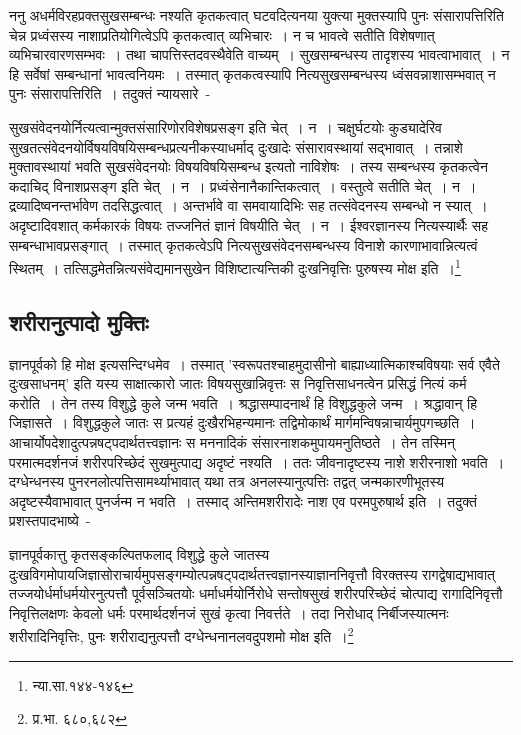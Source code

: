 		ननु अधर्मविरहप्रक्तसुखसम्बन्धः नश्यति कृतकत्वात् घटवदित्यनया युक्त्या मुक्तस्यापि पुनः संसारापत्तिरिति चेन्न प्रध्वंसस्य नाशाप्रतियोगित्वेऽपि कृतकत्वात् व्यभिचारः~। न च भावत्वे सतीति विशेषणात् व्यभिचारवारणसम्भवः~। तथा चापत्तिस्तदवस्थैवेति वाच्यम्~। सुखसम्बन्धस्य तादृशस्य भावत्वाभावात्~। न हि सर्वेषां सम्बन्धानां भावत्वनियमः~। तस्मात् कृतकत्वस्यापि नित्यसुखसम्बन्धस्य ध्वंसवन्नाशासम्भवात् न पुनः संसारापत्तिरिति~। तदुक्तं न्यायसारे~-

		{\fontsize{11.7}{0}\selectfont\s सुखसंवेदनयोर्नित्यत्वान्मुक्तसंसारिणोरविशेषप्रसङ्ग इति चेत्~। न~। चक्षुर्घटयोः कुड्यादेरिव सुखतत्संवेदनयोर्विषयविषयिसम्बन्धप्रत्यनीकस्याधर्माद् दुःखादेः संसारावस्थायां सद्भावात्~। तन्नाशे मुक्तावस्थायां भवति सुखसंवेदनयोः विषयविषयिसम्बन्ध इत्यतो नाविशेषः~। तस्य सम्बन्धस्य कृतकत्वेन कदाचिद् विनाशप्रसङ्ग इति चेत्~। न~। प्रध्वंसेनानैकान्तिकत्वात्~। वस्तुत्वे सतीति चेत्~। न~। द्रव्यादिष्वनन्तर्भावेण तदसिद्धत्वात्~। अन्तर्भावे वा समवायादिभिः सह तत्संवेदनस्य सम्बन्धो न स्यात्~। अदृष्टादिवशात् कर्मकारकं विषयः तज्जनितं ज्ञानं विषयीति चेत्~। न~। ईश्वरज्ञानस्य नित्यस्यार्थैः सह सम्बन्धाभावप्रसङ्गात्~। तस्मात् कृतकत्वेऽपि नित्यसुखसंवेदनसम्बन्धस्य विनाशे कारणाभावान्नित्यत्वं स्थितम्~। तत्सिद्धमेतन्नित्यसंवेद्यमानसुखेन विशिष्टात्यन्तिकी दुःखनिवृत्तिः पुरुषस्य मोक्ष इति~।\footnote{न्या.सा.१४४-१४६}}

		\subsection{शरीरानुत्पादो मुक्तिः}

		ज्ञानपूर्वको हि मोक्ष इत्यसन्दिग्धमेव~। तस्मात् 'स्वरूपतश्चाहमुदासीनो बाह्याध्यात्मिकाश्चविषयाः सर्व एवैते दुःखसाधनम्' इति यस्य साक्षात्कारो जातः विषयसुखान्निवृत्तः स निवृत्तिसाधनत्वेन प्रसिद्धं नित्यं कर्म करोति~। तेन तस्य विशुद्धे कुले जन्म भवति~। श्रद्धासम्पादनार्थं हि विशुद्धकुले जन्म~। श्रद्धावान् हि जिज्ञासते~। विशुद्धकुले जातः स प्रत्यहं दुःखैरभिहन्यमानः तद्विमोकार्थं मार्गमन्विषन्नाचार्यमुपगच्छति~। आचार्योपदेशादुत्पन्नषट्पदार्थतत्त्वज्ञानः स मननादिकं संसारनाशकमुपायमनुतिष्ठते~। तेन तस्मिन् परमात्मदर्शनजं शरीरपरिच्छेदं सुखमुत्पाद्य अदृष्टं नश्यति~। ततः जीवनादृष्टस्य नाशे शरीरनाशो भवति~। दग्धेन्धनस्य पुनरनलोत्पत्तिसामर्थ्याभावात् यथा तत्र अनलस्यानुत्पत्तिः तद्वत् जन्मकारणीभूतस्य अदृष्टस्यैवाभावात् पुनर्जन्म न भवति~। तस्माद् अन्तिमशरीरादेः नाश एव परमपुरुषार्थ इति~। तदुक्तं प्रशस्तपादभाष्ये~-

		{\fontsize{11.7}{0}\selectfont\s ज्ञानपूर्वकात्तु कृतसङ्कल्पितफलाद् विशुद्धे कुले जातस्य दुःखविगमोपायजिज्ञासोराचार्यमुपसङ्गम्योत्पन्नषट्पदार्थतत्त्वज्ञानस्याज्ञाननिवृत्तौ विरक्तस्य रागद्वेषाद्यभावात् तज्जयोर्धर्माधर्मयोरनुत्पत्तौ पूर्वसञ्चितयोः धर्माधर्मयोर्निरोधे सन्तोषसुखं शरीरपरिच्छेदं चोत्पाद्य रागादिनिवृत्तौ निवृत्तिलक्षणः केवलो धर्मः परमार्थदर्शनजं सुखं कृत्वा निवर्त्तते~। तदा निरोधाद् निर्बीजस्यात्मनः शरीरादिनिवृत्तिः, पुनः शरीराद्यनुत्पत्तौ दग्धेन्धनानलवदुपशमो मोक्ष इति~।\footnote{प्र.भा. ६८०,६८२}}


